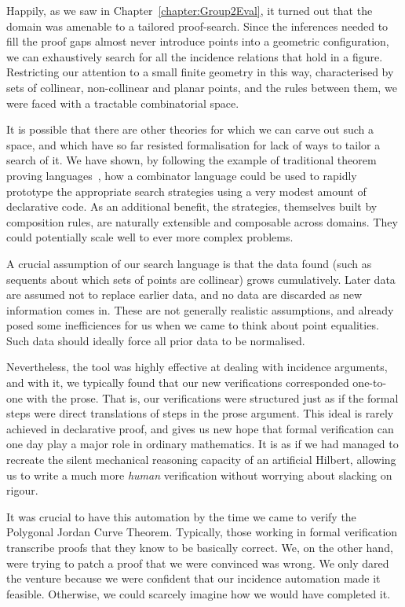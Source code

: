 Happily, as we saw in Chapter~\ref{chapter:Group2Eval}, it turned out that the domain was amenable to a tailored proof-search. Since the inferences needed to fill the proof gaps almost never introduce points into a geometric configuration, we can exhaustively search for all the incidence relations that hold in a figure. Restricting our attention to a small finite geometry in this way, characterised by sets of collinear, non-collinear and planar points, and the rules between them, we were faced with a tractable combinatorial space.

It is possible that there are other theories for which we can carve out such a space, and which have so far resisted formalisation for lack of ways to tailor a search of it. We have shown, by following the example of traditional theorem proving languages~\cite{Tactics}, how a combinator language could be used to rapidly prototype the appropriate search strategies using a very modest amount of declarative code. As an additional benefit, the strategies, themselves built by composition rules, are naturally extensible and composable across domains. They could potentially scale well to ever more complex problems.

A crucial assumption of our search language is that the data found (such as sequents about which sets of points are collinear) grows cumulatively. Later data are assumed not to replace earlier data, and no data are discarded as new information comes in. These are not generally realistic assumptions, and already posed some inefficiences for us when we came to think about point equalities. Such data should ideally force all prior data to be normalised.

Nevertheless, the tool was highly effective at dealing with incidence arguments, and with it, we typically found that our new verifications corresponded one-to-one with the prose. That is, our verifications were structured just as if the formal steps were direct translations of steps in the prose argument. This ideal is rarely achieved in declarative proof, and gives us new hope that formal verification can one day play a major role in ordinary mathematics. It is as if we had managed to recreate the silent mechanical reasoning capacity of an artificial Hilbert, allowing us to write a much more \emph{human} verification without worrying about slacking on rigour.

It was crucial to have this automation by the time we came to verify the Polygonal Jordan Curve Theorem. Typically, those working in formal verification transcribe proofs that they know to be basically correct. We, on the other hand, were trying to patch a proof that we were convinced was wrong. We only dared the venture because we were confident that our incidence automation made it feasible. Otherwise, we could scarcely imagine how we would have completed it.

